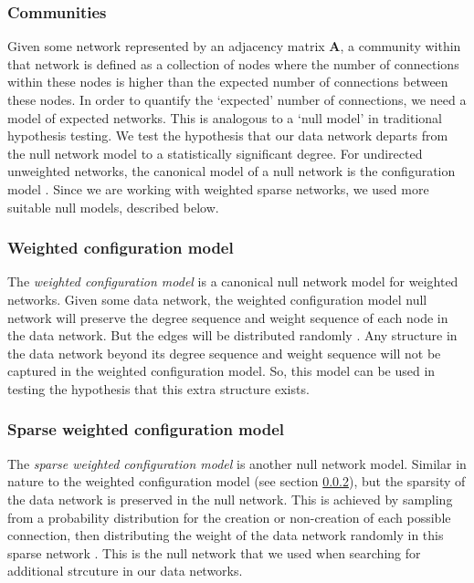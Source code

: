 \documentclass[a4paper,12pt]{article}
\theoremstyle{definition}
\begin{document}
        \subsubsection{Communities}
        Given some network represented by an adjacency matrix $\mathbf{A}$, a community within that network is defined as a collection of nodes where the number of connections within these nodes is higher than the expected number of connections between these nodes. In order to quantify the `expected' number of connections, we need a model of expected networks. This is analogous to a `null model' in traditional hypothesis testing. We test the hypothesis that our data network departs from the null network model to a statistically significant degree. For undirected unweighted networks, the canonical model of a null network is the configuration model \cite{fosdick}. Since we are working with weighted sparse networks, we used more suitable null models, described below.

        \subsubsection{Weighted configuration model}\label{sec:weight_configuration_model}
        The \textit{weighted configuration model} is a canonical null network model for weighted networks. Given some data network, the weighted configuration model null network will preserve the degree sequence and weight sequence of each node in the data network. But the edges will be distributed randomly \cite{fosdick}. Any structure in the data network beyond its degree sequence and weight sequence will not be captured in the weighted configuration model. So, this model can be used in testing the hypothesis that this extra structure exists.

        \subsubsection{Sparse weighted configuration model}\label{sec:sparse_weighted_configuration_model}
        The \textit{sparse weighted configuration model} is another null network model. Similar in nature to the weighted configuration model (see section \ref{sec:weight_configuration_model}), but the sparsity of the data network is preserved in the null network. This is achieved by sampling from a probability distribution for the creation or non-creation of each possible connection, then distributing the weight of the data network randomly in this sparse network \cite{humphries}. This is the null network that we used when searching for additional strcuture in our data networks.
\end{document}
